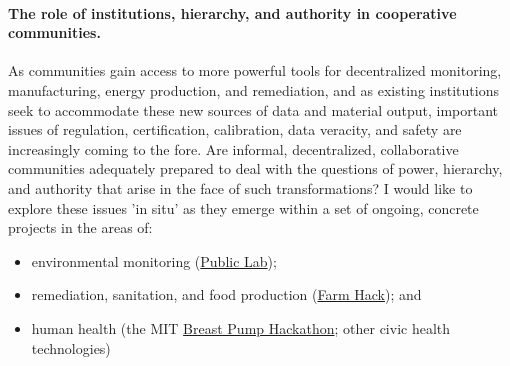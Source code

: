 \documentclass[10pt]{article}
\begin{document}

\paragraph{The role of institutions, hierarchy, and authority in cooperative communities.} As communities gain access to more powerful tools for decentralized monitoring, manufacturing, energy production, and remediation, and as existing institutions seek to accommodate these new sources of data and material output, important issues of regulation, certification, calibration, data veracity, and safety are increasingly coming to the fore.  Are informal, decentralized, collaborative communities adequately prepared to deal with the questions of power, hierarchy, and authority that arise in the face of such transformations? I would like to explore these issues 'in situ' as they emerge within a set of ongoing, concrete projects in the areas of: 

\begin{itemize}
\item environmental monitoring (\href{http://publiclab.org}{Public Lab});
\item remediation, sanitation, and food production (\href{http://farmhack.net}{Farm Hack}); and 
\item human health (the MIT \href{http://breastpump.media.mit.edu/}{Breast Pump Hackathon}; other civic health technologies)
\end{itemize}
\end{document}
